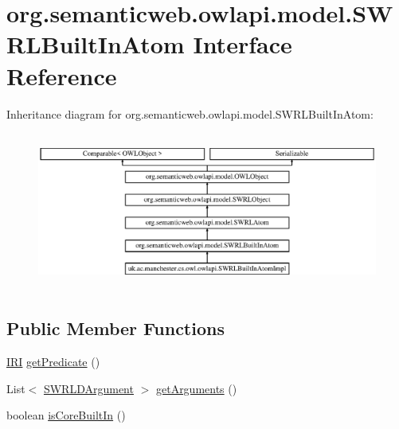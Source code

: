 \hypertarget{interfaceorg_1_1semanticweb_1_1owlapi_1_1model_1_1_s_w_r_l_built_in_atom}{\section{org.\-semanticweb.\-owlapi.\-model.\-S\-W\-R\-L\-Built\-In\-Atom Interface Reference}
\label{interfaceorg_1_1semanticweb_1_1owlapi_1_1model_1_1_s_w_r_l_built_in_atom}
}
Inheritance diagram for org.\-semanticweb.\-owlapi.\-model.\-S\-W\-R\-L\-Built\-In\-Atom\-:\begin{figure}[H]
\begin{center}
\leavevmode
\includegraphics[height=5.217391cm]{interfaceorg_1_1semanticweb_1_1owlapi_1_1model_1_1_s_w_r_l_built_in_atom}
\end{center}
\end{figure}
\subsection*{Public Member Functions}
\begin{DoxyCompactItemize}
\item 
\hyperlink{classorg_1_1semanticweb_1_1owlapi_1_1model_1_1_i_r_i}{I\-R\-I} \hyperlink{interfaceorg_1_1semanticweb_1_1owlapi_1_1model_1_1_s_w_r_l_built_in_atom_a47ff6890f5203424c6781793a33fbe87}{get\-Predicate} ()
\item 
List$<$ \hyperlink{interfaceorg_1_1semanticweb_1_1owlapi_1_1model_1_1_s_w_r_l_d_argument}{S\-W\-R\-L\-D\-Argument} $>$ \hyperlink{interfaceorg_1_1semanticweb_1_1owlapi_1_1model_1_1_s_w_r_l_built_in_atom_a142ee39a0f95cffa179a7564be9ac5d7}{get\-Arguments} ()
\item 
boolean \hyperlink{interfaceorg_1_1semanticweb_1_1owlapi_1_1model_1_1_s_w_r_l_built_in_atom_a9efbe4f673a5e7faf3f1ef3a73661874}{is\-Core\-Built\-In} ()
\end{DoxyCompactItemize}


